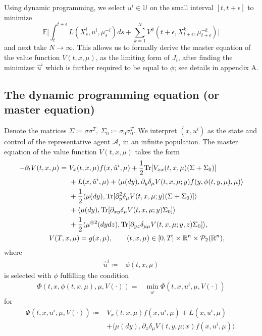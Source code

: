 \documentclass{amsart}
\theoremstyle{definition}
\theoremstyle{remark}
\def\cal{\mathcal}
\def\EE{{\mathbb E}}
\def\deltae{\epsilon}
\numberwithin{equation}{section}
\begin{document}
Using  dynamic programming, we select $u^i\in {\mathbb U}$ on the small interval $[t, t+\deltae]$ to minimize
$$\EE\Big[ \int_t^{t+\epsilon} L(X_s^i, u^i,
\mu_s^{-i})ds+
\sum_{k=1}^NV^\phi({t+\deltae}, X^k_{t+\deltae},
\mu^{-k}_{t+\deltae} )\Big]
$$
 and next take $N\to \infty$. This allows us to formally derive the master equation of the value function $V(t,x,\mu)$, as the limiting form of $J_i$, after finding the minimizer $\hat u^i$ which is further required to be equal to $\phi$; see details in  appendix A.


\subsection{The dynamic programming equation (or master equation)}

Denote the matrices
$
\Sigma \coloneqq  \sigma \sigma^T,\
\Sigma_0 \coloneqq \sigma_0 \sigma_0^{T}.
$
 We interpret $(x, u^i)$ as the state and control of the representative agent $ {\mathcal A}_i $ in an infinite population.
The master equation of the value function $V(t,x,\mu)$ takes the form
\begin{align}
- \partial_t V(t, x, \mu)
= \ &   V_x (t, x, \mu)
f(x, \hat u^i, \mu) + \frac{1}{2} {\rm Tr}
[ V_{xx}(t, x, \mu) (\Sigma+\Sigma_0)  ]
\label{MEVwoCN}   \\
&+ L(x, \hat u^i, \mu)  + \langle \mu(dy),  \partial_y\delta_\mu V(t,x, \mu; y) f( y, \phi(t, y, \mu),\mu)\rangle \notag  \\
&+\frac{1}{2} \langle \mu(dy), {\rm Tr}[
\partial_{y}^2 \delta_\mu
V(t, x, \mu; y) (\Sigma+\Sigma_0)]\rangle \notag \\
&+\langle \mu(dy),  {\rm Tr} [ \partial_{xy}\delta_\mu V(t,x, \mu;y)  \Sigma_0 ]\rangle \notag  \\
&+\frac{1}{2}\langle \mu^{\otimes 2}(dydz),  {\rm Tr}[\partial_{yz}\delta_{\mu\mu} V (t, x, \mu;y, z)
\Sigma_0]\rangle ,\notag\\
&\hskip -1cmV(T, x, \mu)=g(x,\mu),\qquad (t,x,\mu)\in[0,T]\times \mathbb{R}^{n}\times
 {\cal P}_2(\mathbb{R}^n), \label{vtcg}
\end{align}
where
 \begin{align}
 \hat u^i\coloneqq & \phi(t,x, \mu)
 \label{optu_noCN}
 \end{align} is selected with $\phi$ fulfilling the  condition
\begin{align}
 \Phi(t, x,  \phi(t, x, \mu),\mu, V(\cdot))=& \min_{u^i}\Phi(t, x, u^i,\mu,   V(\cdot) )
\end{align}
for
\begin{align}
\Phi(t, x, u^i,\mu,   V(\cdot) )
 \coloneqq &
 V_x (t, x, \mu)
f(x, u^i, \mu) + L(x, u^i, \mu)  \nonumber\\
&   +\langle
\mu(dy),  \partial_{x} \delta_\mu V(t, y, \mu; x) f(x,  u^i,\mu)   \rangle . \nonumber %
\end{align}
\end{document}
